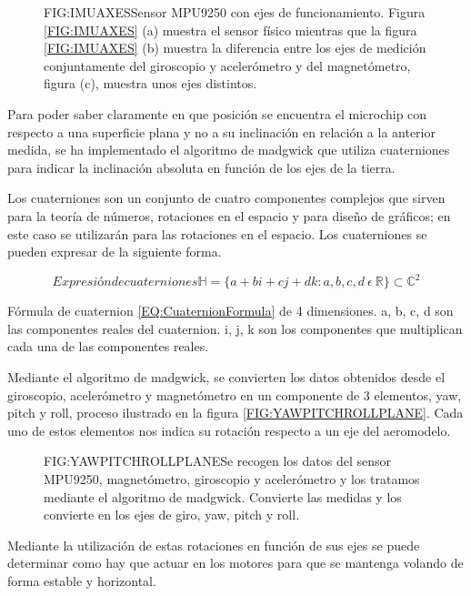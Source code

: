 \begin{figure}[IMU con ejes de medición]{FIG:IMUAXES}{Sensor MPU9250 con ejes de funcionamiento. Figura \ref{FIG:IMUAXES} (a) muestra el sensor físico mientras que la figura \ref{FIG:IMUAXES} (b) muestra la diferencia entre los ejes de medición conjuntamente del giroscopio y acelerómetro y del magnetómetro, figura (c), muestra unos ejes distintos.}
\end{figure}
 
 Para poder saber claramente en que posición se encuentra el microchip con respecto a una superficie plana y no a su inclinación en relación a la anterior medida, se ha implementado el algoritmo de madgwick\cite{Act2012} que utiliza cuaterniones para indicar la inclinación absoluta en función de los ejes de la tierra. 
 
 Los cuaterniones son un conjunto de cuatro componentes complejos que sirven para la teoría de números, rotaciones en el espacio y para diseño de gráficos; en este caso se utilizarán para las rotaciones en el espacio. Los cuaterniones\cite{Graves1999} se pueden expresar de la siguiente forma.
 
\begin{equation}[EQ:CuaternionFormula]{Expresión de cuaterniones}
	{\mathbb{H}= \{ {a+bi+cj+dk:a,b,c,d\:\epsilon\:\mathbb{R}} \} \subset  \mathbb{C}^{2}}
	\end{equation}
	
	Fórmula de cuaternion \ref{EQ:CuaternionFormula} de 4 dimensiones. a, b, c, d son las componentes reales del cuaternion. i, j, k  son los componentes que multiplican cada una de las componentes reales.

   Mediante el algoritmo de madgwick, se convierten los datos obtenidos desde el giroscopio, acelerómetro y magnetómetro en un componente de 3 elementos, yaw, pitch y roll, proceso ilustrado en la figura \ref{FIG:YAWPITCHROLLPLANE}.
   Cada uno de estos elementos nos indica su rotación respecto a un eje del aeromodelo. 
 

\begin{figure}[Ejes yaw, pitch y roll]{FIG:YAWPITCHROLLPLANE}{Se recogen los datos del sensor MPU9250, magnetómetro, giroscopio y acelerómetro y los tratamos mediante el algoritmo de madgwick. Convierte las medidas y los convierte en los ejes de giro, yaw, pitch y roll.}
\end{figure}
 
 Mediante la utilización de estas rotaciones en función de sus ejes se puede determinar como hay que actuar en los motores para que se mantenga volando de forma estable y horizontal.
  


